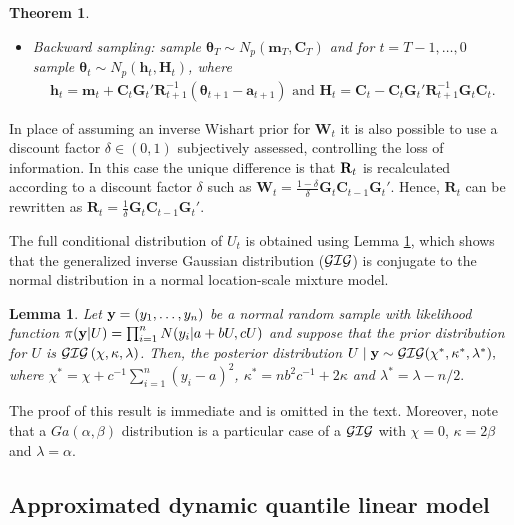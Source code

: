 \documentclass[12pt,a4paper]{article}\usepackage[]{graphicx}\usepackage[]{color}\usepackage{subfigure}
\newtheorem{myth}{Theorem}[section]
\newtheorem{myle}{Lemma}[section]
\newcommand{\bfGt}{\mathbf{G}_t}
\newcommand{\bfWt}{\mathbf{W}_t}
\newcommand{\bftheta}{\boldsymbol{\theta}}
\begin{document}
\begin{myth}
\begin{description}
\begin{itemize}
\item[(ii)] Backward sampling: sample $\bftheta_T \sim N_{p}(\mathbf{m}_T, \mathbf{C}_T)$ and for $t=T-1,\dots,0$ sample $\bftheta_t \sim N_{p}(\mathbf{h}_t, \mathbf{H}_t)$, where
\begin{eqnarray*}
\mathbf{h}_t = \mathbf{m}_t + \mathbf{C}_t \bfGt' \mathbf{R}_{t+1}^{-1} (\bftheta_{t+1} - \mathbf{a}_{t+1}) \mbox{ and }
\mathbf{H}_t = \mathbf{C}_t - \mathbf{C}_t \bfGt' \mathbf{R}_{t+1}^{-1} \bfGt  \mathbf{C}_t.
\end{eqnarray*}
\end{itemize}

\end{description}
\end{myth}

In place of assuming an inverse Wishart prior for $\bfWt$ it is also possible to use a discount factor $\delta \in (0,1)$ subjectively assessed, controlling the loss of information. In this case the unique difference is that ${\bf R}_t$ is recalculated according to a discount 
factor $\delta$ such as $\bfWt = \frac{1-\delta}{\delta} \bfGt \mathbf{C}_{t-1} \bfGt'$. Hence, $\mathbf{R}_t$ can be rewritten as 
$\mathbf{R}_t =  \frac{1}{\delta}\bfGt \mathbf{C}_{t-1} \bfGt'$.

The full conditional distribution of $U_t$ is obtained using Lemma \ref{gig_lemma}, which shows that the generalized inverse Gaussian distribution ($\cal{GIG}$) is conjugate to the normal distribution in a  normal location-scale mixture model.

\begin{myle}\label{gig_lemma}  
 Let ${\bf y}=(y_1,\dots,y_n)$ be a normal random sample with  likelihood function   $\pi({\bf y}| U) = \prod_{i=1}^n{N(y_i|a+bU,cU)}$ and suppose that the prior distribution for $U$  is $ \cal{GIG} \left( \chi, \kappa,\lambda\right)$. Then, the posterior distribution $U \mid {\bf y}\sim \cal{GIG}(\chi^*,\kappa^*,\lambda^*),$
 where $\chi^*= \chi+c^{-1}\sum_{i=1}^n{(y_i-a)^2}$, $\kappa^*=nb^2c^{-1} + 2\kappa$ and $\lambda^*=\lambda-n/2.$  
 \end{myle}
The proof of this result is immediate and is omitted in the text. 
Moreover, note that a $Ga(\alpha,\beta)$ distribution is a particular case of a ${\cal GIG}$ with $\chi=0$, $\kappa=2\beta$ and $\lambda=\alpha$.


\subsection{Approximated dynamic quantile linear model}\label{aproximatedDQ}
\noindent
 
\end{document}
